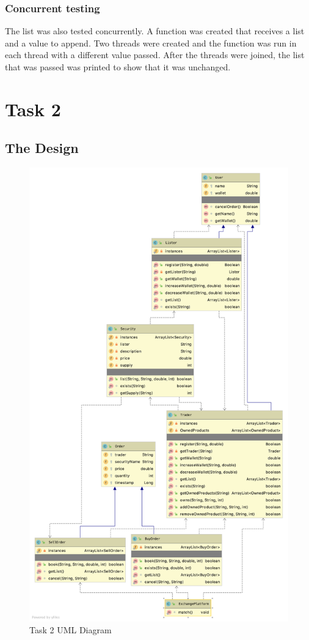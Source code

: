 \documentclass[a4paper, 12pt]{report}
\begin{document}
\subsubsection{Concurrent testing}
The list was also tested concurrently. A function was created that receives a list and a value to append. Two threads were created and the function was run in each thread with a different value passed. After the threads were joined, the list that was passed was printed to show that it was unchanged.

\section{Task 2}

\subsection{The Design}
\begin{figure}[H]
    \centering
    \includegraphics[width=1\textwidth]{"UML 2"}
    \caption{Task 2 UML Diagram}
\end{figure}
\end{document}
